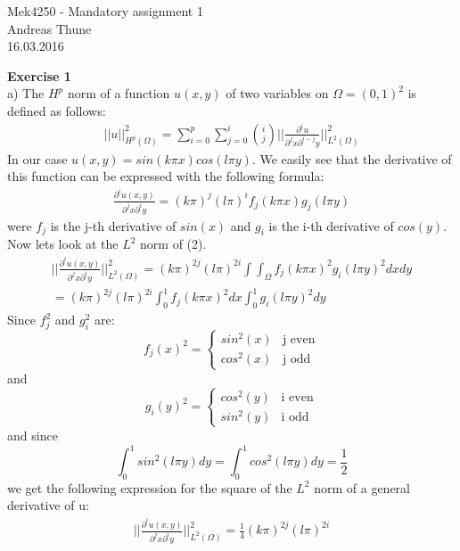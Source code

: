 \documentclass[11pt,a4paper]{report}
\begin{document}
\begin{center}

\LARGE Mek4250 - Mandatory assignment 1
\\
Andreas Thune
\\
\LARGE
16.03.2016

\end{center}
\textbf{Exercise 1}
\\
a) The $H^p$ norm of a function $u(x,y)$ of two variables on $\Omega=(0,1)^2$ is defined as follows: 
\begin{gather}
||u||_{H^p(\Omega)}^2 = \sum_{i=0}^p \sum_{j=0}^{i}\binom {i} {j} ||\frac{\partial^i u}{\partial^j x \partial^{i-j}y}||_{L^2(\Omega)}^2 
\end{gather}
In our case $u(x,y)=sin(k\pi x)cos(l\pi y)$. We easily see that the derivative of this function can be expressed with the following formula: 
\begin{gather}
\frac{\partial^i u(x,y)}{\partial^j x \partial^{i}y} = (k\pi)^j(l\pi)^if_j(k\pi x)g_j(l\pi y)
\end{gather}
were $f_j$ is the j-th derivative of $sin(x)$ and $g_i$ is the i-th derivative of $cos(y)$. Now lets look at the $L^2$ norm of (2).
\begin{gather}
||\frac{\partial^i u(x,y)}{\partial^j x \partial^{i}y}||_{L^2(\Omega)}^2 = (k\pi)^{2j}(l\pi)^{2i} \int\int_{\Omega} f_j(k\pi x)^2g_i(l\pi y)^2 dxdy \\
= (k\pi)^{2j}(l\pi)^{2i}\int_0^1f_j(k\pi x)^2dx\int_0^1g_i(l\pi y)^2dy
\end{gather}
Since $f_j^2$ and $g_i^2$ are:
\begin{displaymath}
   f_j(x)^2 = \left\{
     \begin{array}{lr}
       sin^2(x) &  \text{j even} \\
       cos^2(x) &  \text{j odd}
     \end{array}
   \right.
\end{displaymath}
and 
\begin{displaymath}
   g_i(y)^2 = \left\{
     \begin{array}{lr}
       cos^2(y) &  \text{i even} \\
       sin^2(y) &  \text{i odd}
     \end{array}
   \right.
\end{displaymath}
and since $$\int_0^1sin^2(l\pi y)dy=\int_0^1cos^2(l\pi y)dy=\frac{1}{2} $$
we get the following expression for the square of the $L^2$ norm of a general derivative of u:
\begin{gather}
||\frac{\partial^i u(x,y)}{\partial^j x \partial^{i}y}||_{L^2(\Omega)}^2 = \frac{1}{4}(k\pi)^{2j}(l\pi)^{2i} 
\end{gather}
\end{document}
